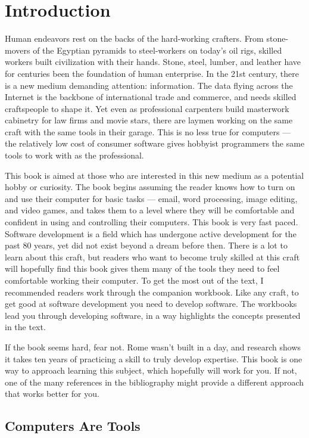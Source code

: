\chapter{Introduction}

Human endeavors rest on the backs of the hard-working crafters. From stone-
movers of the Egyptian pyramids to steel-workers on today's oil rigs, skilled
workers built civilization with their hands. Stone, steel, lumber, and leather
have for centuries been the foundation of human enterprise. In the 21st
century, there is a new medium demanding attention: information. The data
flying across the Internet is the backbone of international trade and
commerce, and needs skilled craftspeople to shape it. Yet even as professional
carpenters build masterwork cabinetry for law firms and movie stars, there are
laymen working on the same craft with the same tools in their garage. This is
no less true for computers --- the relatively low cost of consumer software
gives hobbyist programmers the same tools to work with as the professional.

This book is aimed at those who are interested in this new medium as a
potential hobby or curiosity. The book begins assuming the reader knows how to
turn on and use their computer for basic tasks --- email, word processing,
image editing, and video games, and takes them to a level where they will be
comfortable and confident in using and controlling their computers. This book
is very fast paced. Software development is a field which has undergone active
development for the past 80 years, yet did not exist beyond a dream before
then. There is a lot to learn about this craft, but readers who want to become
truly skilled at this craft will hopefully find this book gives them many of
the tools they need to feel comfortable working their computer. To get the
most out of the text,  I recommended readers work through the companion
workbook. Like any craft, to get good at software development you need to
develop software. The workbooks lead you through developing software, in a way
highlights the concepts presented in the text.

If the book seems hard, fear not. Rome wasn't built in a day, and research
shows it takes ten years of practicing a skill to truly develop expertise.
This book is one way to approach learning this subject, which hopefully will
work for you. If not, one of the many references in the bibliography might
provide a different approach that works better for you.

\section{Computers Are Tools}

